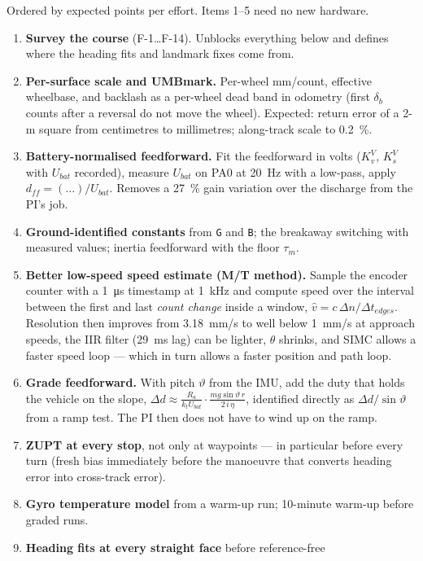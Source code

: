 \documentclass[11pt,a4paper]{article}
\newcommand{\code}[1]{\texttt{\small #1}}
\begin{document}
Ordered by expected points per effort. Items 1--5 need no new hardware.

\begin{enumerate}[leftmargin=7mm]
\item \textbf{Survey the course} (F-1\ldots F-14). Unblocks everything below
and defines where the heading fits and landmark fixes come from.
\item \textbf{Per-surface scale and UMBmark.} Per-wheel mm/count, effective
wheelbase, and backlash as a per-wheel dead band in odometry (first
$\delta_b$ counts after a reversal do not move the wheel). Expected: return error
of a 2-m square from centimetres to millimetres; along-track scale to
\qty{0.2}{\percent}.
\item \textbf{Battery-normalised feedforward.} Fit the feedforward in volts
($K_v^V$, $K_s^V$ with $U_{bat}$ recorded), measure $U_{bat}$ on PA0 at
\qty{20}{Hz} with a low-pass, apply $d_{ff}=(\ldots)/U_{bat}$. Removes a
\qty{27}{\percent} gain variation over the discharge from the PI's job.
\item \textbf{Ground-identified constants} from \code{G} and \code{B}; the
breakaway switching with measured values; inertia feedforward with the floor
$\tau_m$.
\item \textbf{Better low-speed speed estimate (M/T method).} Sample the encoder
counter with a \qty{1}{\micro s} timestamp at \qty{1}{kHz} and compute speed over
the interval between the first and last \emph{count change} inside a window,
$\hat v=c\,\Delta n/\Delta t_{edges}$. Resolution then improves from
\qty{3.18}{mm/s} to well below \qty{1}{mm/s} at approach speeds, the IIR filter
(\qty{29}{ms} lag) can be lighter, $\theta$ shrinks, and SIMC allows a faster
speed loop --- which in turn allows a faster position and path loop.
\item \textbf{Grade feedforward.} With pitch $\vartheta$ from the IMU, add the
duty that holds the vehicle on the slope,
$\Delta d\approx\frac{R_a}{k_t U_{bat}}\cdot\frac{m g\sin\vartheta\,r}{2\,i\,\eta}$,
identified directly as $\Delta d/\sin\vartheta$ from a ramp test. The PI then
does not have to wind up on the ramp.
\item \textbf{ZUPT at every stop}, not only at waypoints --- in particular
before every turn (fresh bias immediately before the manoeuvre that converts
heading error into cross-track error).
\item \textbf{Gyro temperature model} from a warm-up run; 10-minute warm-up before
graded runs.
\item \textbf{Heading fits at every straight face} before reference-free

\end{enumerate}
\end{document}
